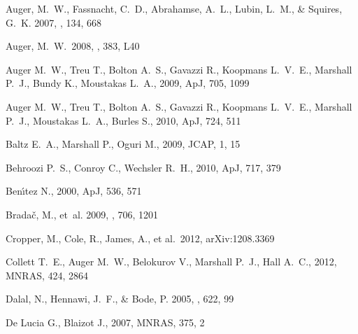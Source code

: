 \begin{thebibliography}{99}


{Auger}, M.~W., {Fassnacht}, C.~D., {Abrahamse}, A.~L., {Lubin}, L.~M., \&
  {Squires}, G.~K. 2007, \aj, 134, 668

 Auger, M.~W.\ 2008, \mnras, 383, 
L40 

Auger M.~W., Treu T., Bolton A.~S., Gavazzi R., Koopmans L.~V.~E., Marshall 
P.~J., Bundy K., Moustakas L.~A., 2009, ApJ, 705, 1099 


Auger M.~W., Treu T., Bolton A.~S., Gavazzi R., Koopmans L.~V.~E., Marshall 
P.~J., Moustakas L.~A., Burles S., 2010, ApJ, 724, 511 


 Baltz E.~A., Marshall P., Oguri M., 2009, JCAP, 1, 15 


 Behroozi P.~S., Conroy C., Wechsler R.~H., 2010, ApJ, 717, 379 


 Ben{\'{\i}}tez N., 2000, ApJ, 536, 571 


{Brada{\v c}}, M., {et~al.} 2009, \apj, 706, 1201

 Cropper, M., Cole, R., 
James, A., et al.\ 2012, arXiv:1208.3369 


 Collett T.~E., Auger M.~W., Belokurov V., 
Marshall P.~J., Hall A.~C., 2012, MNRAS, 424, 2864 




{Dalal}, N., {Hennawi}, J.~F., \& {Bode}, P. 2005, \apj, 622, 99


 De Lucia G., Blaizot J., 2007, MNRAS, 375, 2 



\end{thebibliography}
